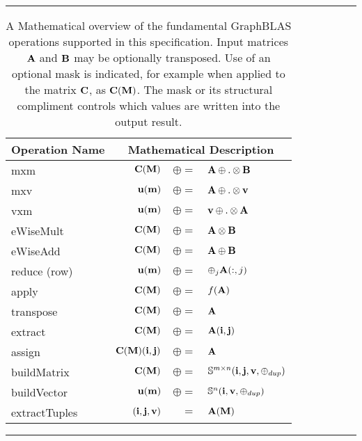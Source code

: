\begin{table*}[h]
\hrule
\begin{center}
\caption{A Mathematical overview of the fundamental GraphBLAS operations supported
in this specification.  Input matrices ${\bf A}$ and ${\bf B}$ may be optionally
transposed.   Use of an optional mask is indicated, for example when applied to the matrix  ${\bf C}$, 
as ${\bf C}({\bf M})$. The mask or its structural compliment controls 
which values are written into the output result.}
\label{Tab:GraphBLASOps}
\begin{tabular}{l|rrl}
{\sf Operation Name} & \multicolumn{3}{c}{Mathematical Description}  \\
\hline
{\sf mxm}          & ${\bf C}({\bf M})$ & $\oplus=$ & ${\bf A} \oplus.\otimes {\bf B}$  \\
{\sf mxv}          & ${\bf u}({\bf m})$ & $\oplus=$ & ${\bf A} \oplus.\otimes {\bf v}$  \\
{\sf vxm}          & ${\bf u}({\bf m})$ & $\oplus=$ & ${\bf v} \oplus.\otimes {\bf A}$  \\
{\sf eWiseMult}    & ${\bf C}({\bf M})$ & $\oplus=$ & ${\bf A} \otimes {\bf B}$  \\
{\sf eWiseAdd}     & ${\bf C}({\bf M})$ & $\oplus=$ & ${\bf A} \oplus  {\bf B}$  \\
{\sf reduce} (row) & ${\bf u}({\bf m})$ & $\oplus=$ & $\oplus_j{\bf A}(:,j)$  \\
{\sf apply}        & ${\bf C}({\bf M})$ & $\oplus=$ & $f({\bf A})$ \\
{\sf transpose}    & ${\bf C}({\bf M})$ & $\oplus=$ & ${\bf A}$ \\
{\sf extract}      & ${\bf C}({\bf M})$ & $\oplus=$ & ${\bf A}({\bf i},{\bf j})$ \\
{\sf assign}       & ${\bf C}({\bf M})({\bf i},{\bf j})$ & $\oplus=$ & ${\bf A}$ \\
{\sf buildMatrix}  & ${\bf C}({\bf M})$ & $\oplus=$ & $\mathbb{S}^{m\times n}({\bf i},{\bf j},{\bf v},\oplus_{dup})$ \\
{\sf buildVector}  & ${\bf u}({\bf m})$ & $\oplus=$ & $\mathbb{S}^{n}({\bf i},{\bf v},\oplus_{dup})$ \\
{\sf extractTuples}& $({\bf i},{\bf j},{\bf v})$ & $=$ & ${\bf A}({\bf M})$ \\
\end{tabular}
\end{center}
\hrule
\end{table*}




